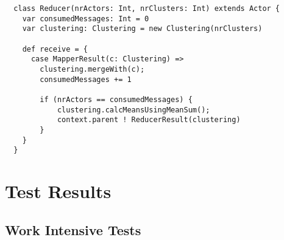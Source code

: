 {\begin{lstlisting}
  class Reducer(nrActors: Int, nrClusters: Int) extends Actor {
    var consumedMessages: Int = 0
    var clustering: Clustering = new Clustering(nrClusters)

    def receive = {
      case MapperResult(c: Clustering) =>
        clustering.mergeWith(c);
        consumedMessages += 1

        if (nrActors == consumedMessages) {
            clustering.calcMeansUsingMeanSum();
            context.parent ! ReducerResult(clustering)
        }
    }
  }  
\end{lstlisting}


\section{Test Results}

\subsection{Work Intensive Tests}

}
